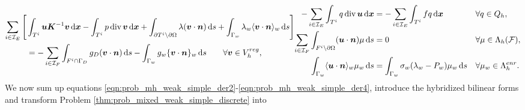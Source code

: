 \begin{subequations}
\begin{align}
    \sum_{i\in \mathcal I_E} \Bigg[ & \int_{T^i}
        \vc u \vc K^{-1} \vc v \dd\bx
        - \int_{T^i} p\,\div\,\vc v \dd\bx %
        + \int_{\partial T^i\setminus \prtl\Omega}
            \lambda (\vc v \cdot \vc n) \dd s
        + \int_{\Gamma_w}
            \lambda_w \avg{\vc v\cdot\vc n}_w \dd s \Bigg] \nonumber\\
        &= -\sum_{i\in \mathcal I_F} \int_{F^i\cap \Gamma_{D}}
            g_{D} (\vc v \cdot \vc n) \dd s
            -\int_{\Gamma_w} g_w \fluct{\vc v \cdot \vc n}_w \dd s
        \qquad \forall \vc v\in V^{reg}_h,
        \label{eqn:prob_mh_weak_simple_der1}
\end{align}
\begin{align}
    -\sum_{i\in \mathcal I_E}
        \int_{T^i} q\,\div\,\vc u \dd\bx
    &= -\sum_{i\in \mathcal I_E}
        \int_{T^i} f q \dd\bx
    && \forall q \in Q_h, \label{eqn:prob_mh_weak_simple_der2} \\ 
    \sum_{i\in \mathcal I_F}
        \int_{F^i\setminus \prtl\Omega}
            (\vc u \cdot \vc n) \mu \dd s &= 0
        && \forall \mu \in \Lambda_h(\mathcal{F}), \label{eqn:prob_mh_weak_simple_der3}\\
    \int_{\Gamma_w} \avg{\vc u\cdot\vc n}_w \mu_w \dd s
    &= \int_{\Gamma_w} \sigma_w (\lambda_w - P_w)\mu_w \dd s
    && \forall \mu_w \in \Lambda^{enr}_h. \label{eqn:prob_mh_weak_simple_der4}
\end{align}
\end{subequations}
%
We now sum up equations \eqref{eqn:prob_mh_weak_simple_der2}-\eqref{eqn:prob_mh_weak_simple_der4},
introduce the hybridized bilinear forms
and transform Problem \ref{thm:prob_mixed_weak_simple_discrete} into

